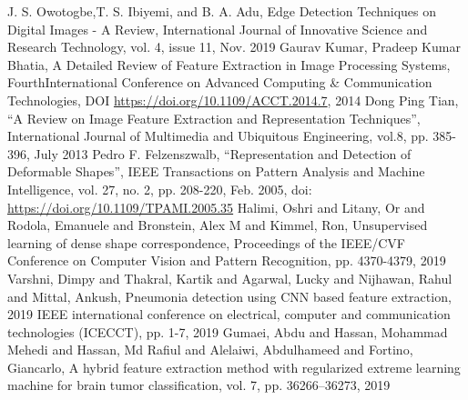 \documentclass[conference]{IEEEtran}
\begin{document}




\begin{thebibliography}{00}

 J. S. Owotogbe,T. S. Ibiyemi, and B. A. Adu, Edge Detection Techniques on Digital Images - A Review, International Journal of Innovative Science and Research Technology, vol. 4, issue 11, Nov. 2019
 Gaurav Kumar, Pradeep Kumar Bhatia, A Detailed Review of Feature Extraction in Image Processing Systems, FourthInternational Conference on Advanced Computing \& Communication Technologies, DOI \url{https://doi.org/10.1109/ACCT.2014.7}, 2014
 Dong Ping Tian, ``A Review on Image Feature Extraction and Representation Techniques'', International Journal of Multimedia and Ubiquitous Engineering, vol.8, pp. 385-396, July 2013
 Pedro F. Felzenszwalb, ``Representation and Detection of Deformable Shapes'', IEEE Transactions on Pattern Analysis and Machine Intelligence, vol. 27, no. 2, pp. 208-220, Feb. 2005, doi: \url{https://doi.org/10.1109/TPAMI.2005.35} 
 Halimi, Oshri and Litany, Or and Rodola, Emanuele and Bronstein, Alex M and Kimmel, Ron, Unsupervised learning of dense shape correspondence, Proceedings of the IEEE/CVF Conference on Computer Vision and Pattern Recognition, pp. 4370-4379, 2019
 Varshni, Dimpy and Thakral, Kartik and Agarwal, Lucky and Nijhawan, Rahul and Mittal, Ankush, Pneumonia detection using CNN based feature extraction, 2019 IEEE international conference on electrical, computer and communication technologies (ICECCT), pp. 1-7, 2019
 Gumaei, Abdu and Hassan, Mohammad Mehedi and Hassan, Md Rafiul and Alelaiwi, Abdulhameed and Fortino, Giancarlo, A hybrid feature extraction method with regularized extreme learning machine for brain tumor classification, vol. 7, pp. 36266--36273, 2019


\end{thebibliography}
\end{document}
